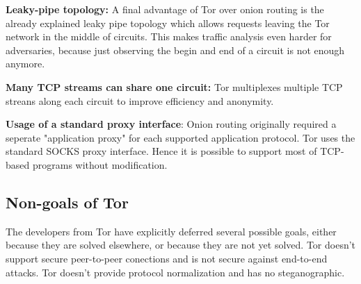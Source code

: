 \textbf{Leaky-pipe topology:} A final advantage of Tor over onion routing is the already explained leaky pipe topology which allows requests leaving the Tor network in the middle of circuits. This makes traffic analysis even harder for adversaries, because just observing the begin and end of a circuit is not enough anymore.

\textbf{Many TCP streams can share one circuit: } Tor multiplexes multiple TCP streans along each circuit to improve efficiency and anonymity.

\textbf{Usage of a standard proxy interface}: Onion routing originally required a seperate "application proxy" for each supported application protocol. Tor uses the standard SOCKS proxy interface. Hence it is possible to support most of TCP-based programs without modification.

\subsection{Non-goals of Tor}
The developers from Tor have explicitly deferred several possible goals, either because they are solved elsewhere, or because they are not yet solved. Tor doesn't support secure peer-to-peer conections and is not secure against end-to-end attacks. Tor doesn't provide protocol normalization and has no steganographic.
